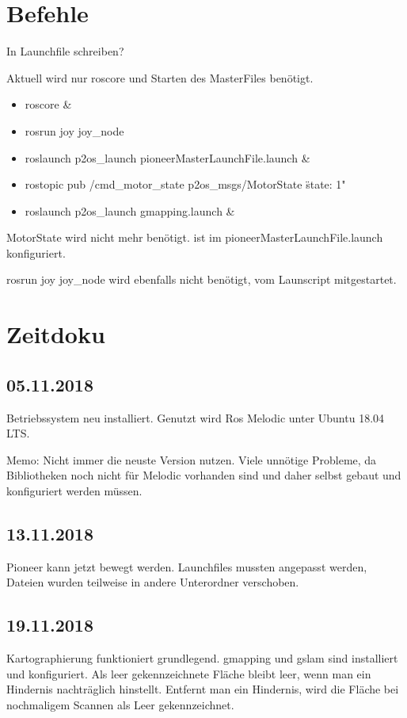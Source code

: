 \documentclass{scrartcl}%
\begin{document}
\section{Befehle}
In Launchfile schreiben?

Aktuell wird nur roscore und Starten des MasterFiles benötigt.
\begin{itemize}
	\item roscore \&
	\item rosrun joy joy\_node
	\item roslaunch p2os\_launch pioneerMasterLaunchFile.launch \&
	\item rostopic pub /cmd\_motor\_state p2os\_msgs/MotorState \"state: 1"
	\item roslaunch p2os\_launch gmapping.launch \&
\end{itemize}
MotorState wird nicht mehr benötigt. ist im pioneerMasterLaunchFile.launch konfiguriert.

rosrun joy joy\_node wird ebenfalls nicht benötigt, vom Launscript mitgestartet.

\section{Zeitdoku}
\subsection{05.11.2018}
Betriebssystem neu installiert. Genutzt wird Ros Melodic unter Ubuntu 18.04 LTS.

Memo: Nicht immer die neuste Version nutzen. Viele unnötige Probleme, da Bibliotheken noch nicht für Melodic vorhanden sind und daher selbst gebaut und konfiguriert werden müssen.

\subsection{13.11.2018}
Pioneer kann jetzt bewegt werden. Launchfiles mussten angepasst werden, Dateien wurden teilweise in andere Unterordner verschoben.

\subsection{19.11.2018}
Kartographierung funktioniert grundlegend. gmapping und gslam sind installiert und konfiguriert. Als leer gekennzeichnete Fläche bleibt leer, wenn man ein Hindernis nachträglich hinstellt. Entfernt man ein Hindernis, wird die Fläche bei nochmaligem Scannen als Leer gekennzeichnet.
\end{document}
